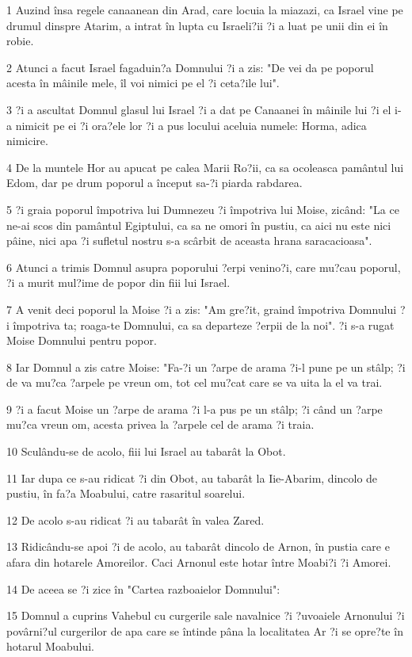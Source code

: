 \par 1 Auzind însa regele canaanean din Arad, care locuia la miazazi, ca Israel vine pe drumul dinspre Atarim, a intrat în lupta cu Israeli?ii ?i a luat pe unii din ei în robie.
\par 2 Atunci a facut Israel fagaduin?a Domnului ?i a zis: "De vei da pe poporul acesta în mâinile mele, îl voi nimici pe el ?i ceta?ile lui".
\par 3 ?i a ascultat Domnul glasul lui Israel ?i a dat pe Canaanei în mâinile lui ?i el i-a nimicit pe ei ?i ora?ele lor ?i a pus locului aceluia numele: Horma, adica nimicire.
\par 4 De la muntele Hor au apucat pe calea Marii Ro?ii, ca sa ocoleasca pamântul lui Edom, dar pe drum poporul a început sa-?i piarda rabdarea.
\par 5 ?i graia poporul împotriva lui Dumnezeu ?i împotriva lui Moise, zicând: "La ce ne-ai scos din pamântul Egiptului, ca sa ne omori în pustiu, ca aici nu este nici pâine, nici apa ?i sufletul nostru s-a scârbit de aceasta hrana saracacioasa".
\par 6 Atunci a trimis Domnul asupra poporului ?erpi venino?i, care mu?cau poporul, ?i a murit mul?ime de popor din fiii lui Israel.
\par 7 A venit deci poporul la Moise ?i a zis: "Am gre?it, graind împotriva Domnului ?i împotriva ta; roaga-te Domnului, ca sa departeze ?erpii de la noi". ?i s-a rugat Moise Domnului pentru popor.
\par 8 Iar Domnul a zis catre Moise: "Fa-?i un ?arpe de arama ?i-l pune pe un stâlp; ?i de va mu?ca ?arpele pe vreun om, tot cel mu?cat care se va uita la el va trai.
\par 9 ?i a facut Moise un ?arpe de arama ?i l-a pus pe un stâlp; ?i când un ?arpe mu?ca vreun om, acesta privea la ?arpele cel de arama ?i traia.
\par 10 Sculându-se de acolo, fiii lui Israel au tabarât la Obot.
\par 11 Iar dupa ce s-au ridicat ?i din Obot, au tabarât la Iie-Abarim, dincolo de pustiu, în fa?a Moabului, catre rasaritul soarelui.
\par 12 De acolo s-au ridicat ?i au tabarât în valea Zared.
\par 13 Ridicându-se apoi ?i de acolo, au tabarât dincolo de Arnon, în pustia care e afara din hotarele Amoreilor. Caci Arnonul este hotar între Moabi?i ?i Amorei.
\par 14 De aceea se ?i zice în "Cartea razboaielor Domnului":
\par 15 Domnul a cuprins Vahebul cu curgerile sale navalnice ?i ?uvoaiele Arnonului ?i povârni?ul curgerilor de apa care se întinde pâna la localitatea Ar ?i se opre?te în hotarul Moabului.
